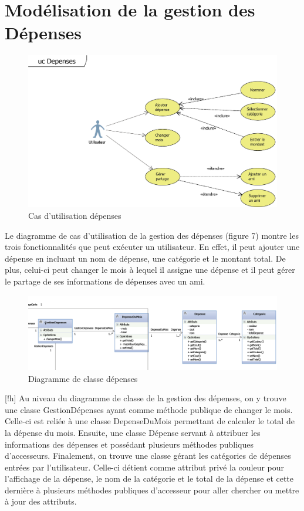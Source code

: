\documentclass[11pt]{article}
\begin{document}
\newpage
\section{Modélisation de la gestion des Dépenses}
\begin{figure}[!h]
        \centering \includegraphics[scale=1]{ucDepenses.png}
        \caption{Cas d'utilisation dépenses}
         \label{fig:ucDepenses}
\end{figure}
Le diagramme de cas d’utilisation de la gestion des dépenses (figure 7) montre les trois fonctionnalités que peut exécuter un utilisateur. En effet, il peut ajouter une dépense en incluant un nom de dépense, une catégorie et le montant total. De plus, celui-ci peut changer le mois à lequel il assigne une dépense et il peut gérer le partage de ses informations de dépenses avec un ami.
\begin{figure}[!h]
        \centering \includegraphics[scale=1]{depense.png}
        \caption{Diagramme de classe dépenses}
         \label{fig:depense}
\end{figure}[!h]
 Au niveau du diagramme de classe de la gestion des dépenses, on y trouve une classe GestionDépenses ayant comme méthode publique de changer le mois. Celle-ci est reliée à une classe DepenseDuMois permettant de calculer le total de la dépense du mois. Ensuite, une classe Dépense servant à attribuer les informations des dépenses et possédant plusieurs méthodes publiques d’accesseurs. Finalement, on trouve une classe gérant les catégories de dépenses entrées par l’utilisateur. Celle-ci détient comme attribut privé la couleur pour l’affichage de la dépense, le nom de la catégorie et le total de la dépense et cette dernière à plusieurs méthodes publiques d’accesseur pour aller chercher ou mettre à jour des attributs.
\newpage
\end{document}
